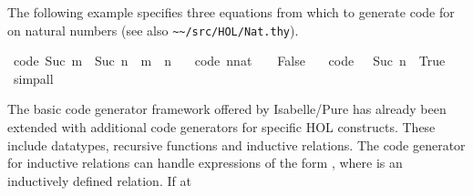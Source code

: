 \begin{isabellebody}
\begin{isamarkuptext}
  The following example specifies three equations from which to
  generate code for  on natural numbers (see also
  \verb|~~/src/HOL/Nat.thy|).%
\end{isamarkuptext}%
\isamarkuptrue%
\isamarkupfalse%
\ {}code{}{}\ {}{}Suc\ m\ {}\ Suc\ n{}\ {}\ {}m\ {}\ n{}{}\isanewline
\ \ \ {}code{}{}\ {}{}{}n{}{}nat{}\ {}\ {}{}\ {}\ False{}\isanewline
\ \ \ {}code{}{}\ {}{}{}\ {}\ Suc\ n{}\ {}\ True{}%
\isadelimproof
\ %
\endisadelimproof
%
\isatagproof
{}\isamarkupfalse%
\ simp{}all%
\endisatagproof
{\isafoldproof}%
%
\isadelimproof
%
\endisadelimproof
%
\isamarkuptrue%
%
\begin{isamarkuptext}%
The basic code generator framework offered by Isabelle/Pure
  has already been extended with additional code generators for
  specific HOL constructs. These include datatypes, recursive
  functions and inductive relations. The code generator for inductive
  relations can handle expressions of the form , where  is an inductively defined relation. If at

\end{isamarkuptext}
\end{isabellebody}

